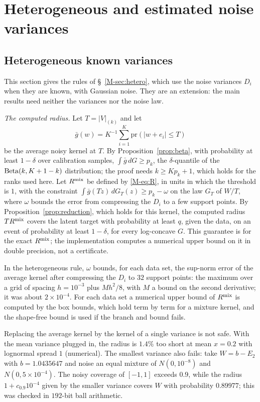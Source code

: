 \documentclass[11pt]{article}
\renewcommand{\_}{\usc\allowbreak}
\newcommand{\pr}{\mathrm{pr}}
\begin{document}
\section{Heterogeneous and estimated noise variances}\label{sec:s-hetero}

\subsection*{Heterogeneous known variances}

This section gives the rules of \S~\ref{M-sec:hetero}, which use the noise variances $D_i$ when they are known, with Gaussian noise. They are an extension: the main results need neither the variances nor the noise law.

\emph{The computed radius.} Let $T = |V|_{(k)}$ and let
\[
\bar g(w) = K^{-1}\sum_{i=1}^K \pr(|w + e_i| \le T)
\]
be the average noisy kernel at $T$. By Proposition~\ref{prop:beta}, with probability at least $1 - \delta$ over calibration samples, $\int \bar g\,dG \ge p_k$, the $\delta$-quantile of the ${\rm Beta}(k, K+1-k)$ distribution; the proof needs $k \ge Kp_k + 1$, which holds for the ranks used here. Let $R^{\rm mix}$ be defined by \eqref{M-eq:R}, in units in which the threshold is $1$, with the constraint $\int \bar g(Tz)\,dG_T(z) \ge p_k - \omega$ on the law $G_T$ of $W/T$, where $\omega$ bounds the error from compressing the $D_i$ to a few support points. By Proposition~\ref{prop:reduction}, which holds for this kernel, the computed radius $T R^{\rm mix}$ covers the latent target with probability at least $q$, given the data, on an event of probability at least $1 - \delta$, for every log-concave $G$. This guarantee is for the exact $R^{\rm mix}$; the implementation computes a numerical upper bound on it in double precision, not a certificate.

In the heterogeneous rule, $\omega$ bounds, for each data set, the sup-norm error of the average kernel after compressing the $D_i$ to $32$ support points: the maximum over a grid of spacing $h = 10^{-3}$ plus $Mh^2/8$, with $M$ a bound on the second derivative; it was about $2\times10^{-4}$. For each data set a numerical upper bound of $R^{\rm mix}$ is computed by the box bounds, which hold term by term for a mixture kernel, and the shape-free bound is used if the branch and bound fails.

Replacing the average kernel by the kernel of a single variance is not safe. With the mean variance plugged in, the radius is $1.4\%$ too short at mean $x = 0.2$ with lognormal spread $1$ (numerical). The smallest variance also fails: take $W = b - E_2$ with $b = 1.0435647$ and noise an equal mixture of $N(0, 10^{-8})$ and $N(0, 5\times10^{-4})$. The noisy coverage of $[-1, 1]$ exceeds $0.9$, while the radius $1 + c_{0.9}10^{-4}$ given by the smaller variance covers $W$ with probability $0.89977$; this was checked in $192$-bit ball arithmetic.
\end{document}
